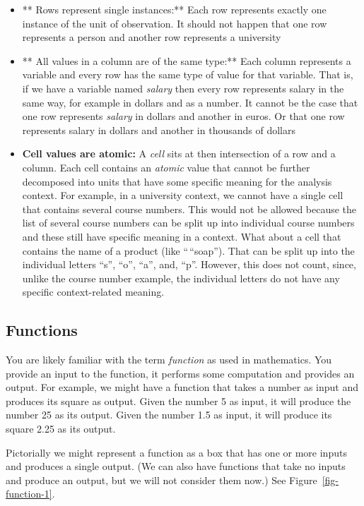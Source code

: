 \documentclass[
  12pt,
  letterpaper,
  DIV=11,
  numbers=noendperiod]{scrreprt}
\providecommand{\tightlist}{%
  \setlength{\itemsep}{0pt}\setlength{\parskip}{0pt}}
\begin{document}
\begin{itemize}
\tightlist
\item
  ** Rows represent single instances:** Each row represents exactly one
  instance of the unit of observation. It should not happen that one row
  represents a person and another row represents a university
\item
  ** All values in a column are of the same type:** Each column
  represents a variable and every row has the same type of value for
  that variable. That is, if we have a variable named \emph{salary} then
  every row represents salary in the same way, for example in dollars
  and as a number. It cannot be the case that one row represents
  \emph{salary} in dollars and another in euros. Or that one row
  represents salary in dollars and another in thousands of dollars
\item
  \textbf{Cell values are atomic:} A \emph{cell} sits at then
  intersection of a row and a column. Each cell contains an
  \emph{atomic} value that cannot be further decomposed into units that
  have some specific meaning for the analysis context. For example, in a
  university context, we cannot have a single cell that contains several
  course numbers. This would not be allowed because the list of several
  course numbers can be split up into individual course numbers and
  these still have specific meaning in a context. What about a cell that
  contains the name of a product (like ``\,``soap''). That can be split
  up into the individual letters ``s'', ``o'', ``a'', and, ``p''.
  However, this does not count, since, unlike the course number example,
  the individual letters do not have any specific context-related
  meaning.
\end{itemize}

\subsection{Functions}\label{functions}

You are likely familiar with the term \emph{function} as used in
mathematics. You provide an input to the function, it performs some
computation and provides an output. For example, we might have a
function that takes a number as input and produces its square as output.
Given the number 5 as input, it will produce the number 25 as its
output. Given the number 1.5 as input, it will produce its square 2.25
as its output.

Pictorially we might represent a function as a box that has one or more
inputs and produces a single output. (We can also have functions that
take no inputs and produce an output, but we will not consider them
now.) See Figure~\ref{fig-function-1}.
\end{document}
